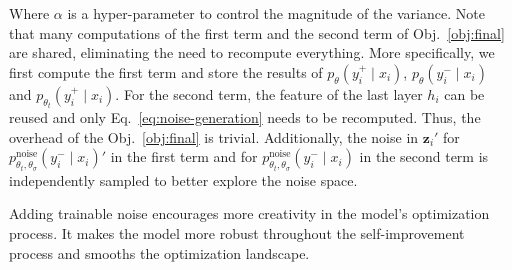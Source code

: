 Where $\alpha$ is a hyper-parameter to control the magnitude of the variance. Note that many computations of the first term and the second term of Obj.~\ref{obj:final} are shared, eliminating the need to recompute everything. More specifically, we first compute the first term and store the results of $p_{\theta}(y_i^+ \mid x_i)$, $p_{\theta}(y_i^- \mid x_i)$ and $p_{\theta_t}(y_i^+ \mid x_i)$. For the second term, the feature of the last layer $h_i$ can be reused and only Eq.~\ref{eq:noise-generation} needs to be recomputed. Thus, the overhead of the Obj.~\ref{obj:final} is trivial. Additionally, the noise in $\mathbf{z}_i'$ for $p_{\theta_t,\theta_{\sigma}}^{\text{noise}}(y_i^- \mid x_i)'$ in the first term and for $p_{\theta_t,\theta_{\sigma}}^{\text{noise}}(y_i^- \mid x_i)$ in the second term is independently sampled to better explore the noise space.


Adding trainable noise encourages more creativity in the model's optimization process. It makes the model more robust throughout the self-improvement process and smooths the optimization landscape.

